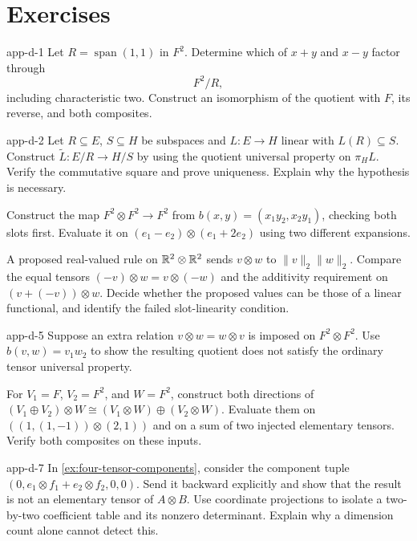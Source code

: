 \section*{Exercises}
\enlargethispage{3\baselineskip}
\begin{hexercise}{app-d-1}
Let $R=\operatorname{span}(1,1)$ in $F^2$. Determine which of $x+y$ and
$x-y$ factor through
\[
F^2/R,
\]
 including characteristic two. Construct an
isomorphism of the quotient with $F$, its reverse, and both composites.
\end{hexercise}
\begin{hexercise}{app-d-2}
Let $R\subseteq E$, $S\subseteq H$ be subspaces and $L:E\to H$ linear
with $L(R)\subseteq S$. Construct $\widetilde L:E/R\to H/S$ by using the
quotient universal property on $\pi_HL$. Verify the commutative square and
prove uniqueness. Explain why the hypothesis is necessary.
\end{hexercise}
\begin{exercise}
Construct the map $F^2\otimes F^2\to F^2$ from
$b(x,y)=(x_1y_2,x_2y_1)$, checking both slots first. Evaluate it on
$(e_1-e_2)\otimes(e_1+2e_2)$ using two different expansions.
\end{exercise}
\begin{exercise}
A proposed real-valued rule on $\mathbb{R}^2\otimes\mathbb{R}^2$ sends
$v\otimes w$ to $\|v\|_2\|w\|_2$. Compare the equal tensors
$(-v)\otimes w=v\otimes(-w)$ and the additivity requirement on
$(v+(-v))\otimes w$. Decide whether the proposed values can be those of
a linear functional, and identify the failed slot-linearity condition.
\end{exercise}
\begin{hexercise}{app-d-5}
Suppose an extra relation $v\otimes w=w\otimes v$ is imposed on
$F^2\otimes F^2$. Use $b(v,w)=v_1w_2$ to show the resulting quotient
does not satisfy the ordinary tensor universal property.
\end{hexercise}
\begin{exercise}
For $V_1=F$, $V_2=F^2$, and $W=F^2$, construct both directions of
$(V_1\oplus V_2)\otimes W\cong(V_1\otimes W)\oplus(V_2\otimes W)$.
Evaluate them on $((1,(1,-1))\otimes(2,1))$ and on a sum of two
injected elementary tensors. Verify both composites on these inputs.
\end{exercise}
\begin{hexercise}{app-d-7}
In \cref{ex:four-tensor-components}, consider the component tuple
$(0,e_1\otimes f_1+e_2\otimes f_2,0,0)$. Send it backward explicitly
and show that the result is not an elementary tensor of $A\otimes B$.
Use coordinate projections to isolate a two-by-two coefficient table and
its nonzero determinant. Explain why a dimension count alone cannot detect this.
\end{hexercise}
